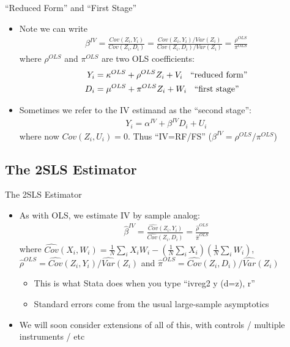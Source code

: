 \documentclass{beamer}
\begin{document}
\begin{frame}{``Reduced Form'' and ``First Stage''}
\begin{itemize}
\item Note we can write 
\begin{align*}
\beta^{IV}=\frac{Cov(Z_i,Y_i)}{Cov(Z_i,D_i)}=\frac{Cov(Z_i,Y_i)/Var(Z_i)}{Cov(Z_i,D_i)/Var(Z_i)}=\frac{\rho^{OLS}}{\pi^{OLS}}
\end{align*}
where $\rho^{OLS}$ and $\pi^{OLS}$ are two OLS coefficients:\pause{}
\begin{align*}
Y_i &= \kappa^{OLS} + \rho^{OLS} Z_i + V_i \hspace{0.2cm}\text{ ``reduced form''}\\
D_i &= \mu^{OLS} + \pi^{OLS} Z_i + W_i\hspace{0.2cm}\text{ ``first stage''}
\end{align*}
\item Sometimes we refer to the IV estimand as the ``second stage'':
\begin{align*}
Y_i=\alpha^{IV}+\beta^{IV}D_i+ U_i
\end{align*}
where now $Cov(Z_i,U_i)=0$. Thus ``IV=RF/FS'' ($\beta^{IV}=\rho^{OLS}/\pi^{OLS}$)
\end{itemize}
\end{frame}

\subsection{The 2SLS Estimator}
\begin{frame}{The 2SLS Estimator}
\begin{itemize}
\item As with OLS, we estimate IV by sample analog:
\begin{align*}
\widehat\beta^{IV}=\frac{\widehat{Cov}(Z_i,Y_i)}{\widehat{Cov}(Z_i,D_i)}=\frac{\widehat\rho^{OLS}}{\widehat\pi^{OLS}}
\end{align*}
where $\widehat{Cov}(X_i,W_i)=\frac{1}{N}\sum_i X_iW_i-\left(\frac{1}{N}\sum_i X_i\right)\left(\frac{1}{N}\sum_i W_i\right)$,\\ $\hat\rho^{OLS}=\widehat{Cov}(Z_i,Y_i)/\widehat{Var}(Z_i)$ and $\hat\pi^{OLS}=\widehat{Cov}(Z_i,D_i)/\widehat{Var}(Z_i)$\smallskip
\begin{itemize}
\item This is what Stata does when you type ``ivreg2 y (d=z), r''\smallskip
\item Standard errors come from the usual large-sample asymptotics
\end{itemize}\bigskip\pause{}
\item We will soon consider extensions of all of this, with controls / multiple instruments / etc
\end{itemize}

\end{frame}
\end{document}
